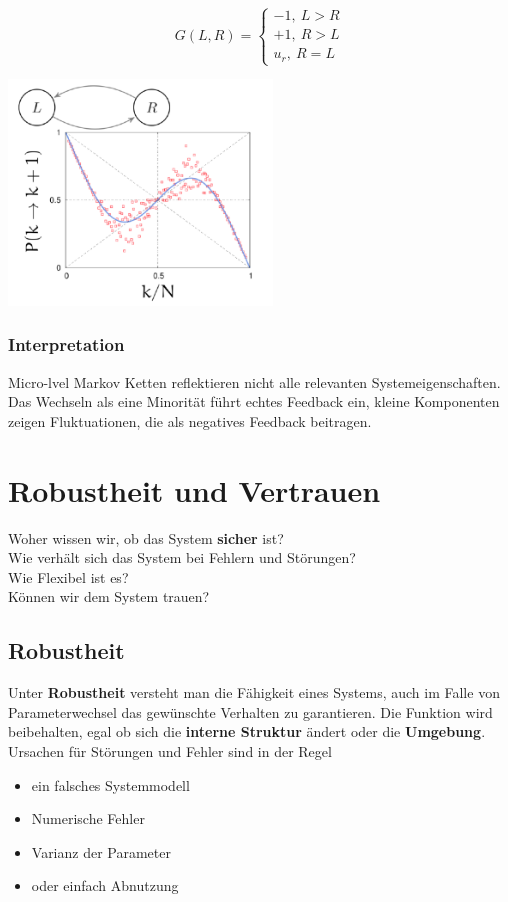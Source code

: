 \documentclass[a4paper]{article}
\begin{document}
$$G(L,R)=\left\{
\begin{matrix}
-1, \ L>R\\
+1, \ R > L\\
u_r, \ R=L
\end{matrix}
\right.$$

\begin{center}
	\includegraphics[height = 6cm]{LR.png}
\end{center}

\subsubsection{Interpretation}
Micro-lvel Markov Ketten reflektieren nicht alle relevanten Systemeigenschaften. Das Wechseln als eine Minorität führt echtes Feedback ein, kleine Komponenten zeigen Fluktuationen, die als negatives Feedback beitragen.
\newpage

\section{Robustheit und Vertrauen}
Woher wissen wir, ob das System \textbf{sicher} ist?\\
Wie verhält sich das System bei Fehlern und Störungen?\\
Wie Flexibel ist es?\\
Können wir dem System trauen?

\subsection{Robustheit}
Unter \textbf{Robustheit} versteht man die Fähigkeit eines Systems, auch im Falle von Parameterwechsel das gewünschte Verhalten zu garantieren. Die Funktion wird beibehalten, egal ob sich die \textbf{interne Struktur} ändert oder die \textbf{Umgebung}.\\

Ursachen für Störungen und Fehler sind in der Regel
\begin{itemize}
	\item ein falsches Systemmodell
	\item Numerische Fehler
	\item Varianz der Parameter
	\item oder einfach Abnutzung
\end{itemize}
\end{document}
